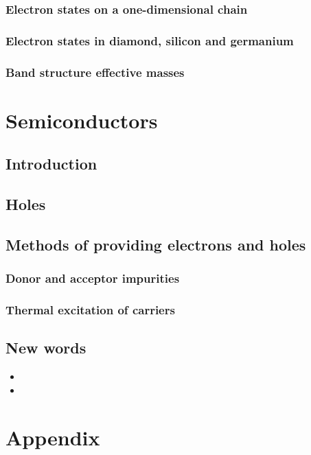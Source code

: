 \documentclass[11pt]{article}
\begin{document}
\subsubsection{Electron states on a one-dimensional chain}
\subsubsection{Electron states in diamond, silicon and germanium}
\subsubsection{Band structure effective masses}

\section{Semiconductors}
\subsection{Introduction}
\subsection{Holes}
\subsection{Methods of providing electrons and holes}
\subsubsection{Donor and acceptor impurities}
\subsubsection{Thermal excitation of carriers}

\newpage
\subsection{New words}
\begin{itemize}
	\item 
	\item
\end{itemize}
\newpage


\newpage
\clearpage
\appendix
\section{Appendix}
\end{document}
